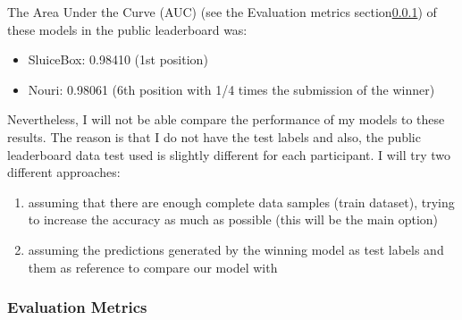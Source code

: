 \documentclass[]{article}
\begin{document}
The Area Under the Curve (AUC) (see the Evaluation metrics section\ref{evaluation-metrics}) of these models in the public leaderboard was:
\begin{itemize}
	\item SluiceBox: 0.98410 (1st position)
	\item Nouri: 0.98061 (6th position with 1/4 times the submission of the winner)
\end{itemize}

Nevertheless, I will not be able compare the performance of my models to these results. The reason is that I do not have the test labels and also, the public leaderboard data test used is slightly different for each participant. I will try two different approaches:
\begin{enumerate}
	\item assuming that there are enough complete data samples (train dataset), trying to increase the accuracy as much as possible (this will be the main option)
	\item assuming the predictions generated by the winning model as test labels and them as reference to compare our model with
\end{enumerate}

\subsubsection{Evaluation Metrics}\label{evaluation-metrics}

\end{document}
